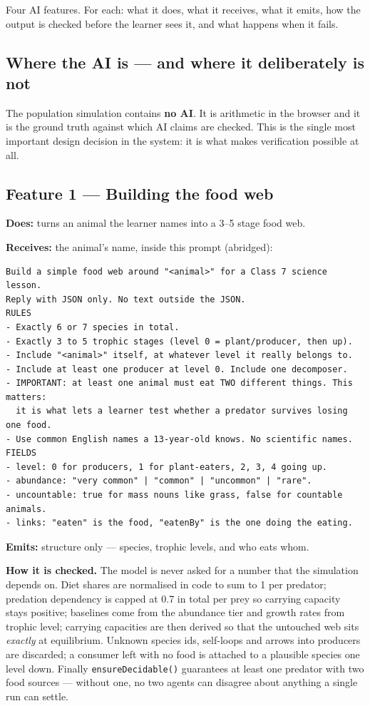 \documentclass[11pt,a4paper]{article}
\begin{document}
Four AI features. For each: what it does, what it receives, what it emits, how the output is
checked before the learner sees it, and what happens when it fails.

\subsection*{Where the AI is --- and where it deliberately is not}

The population simulation contains \textbf{no AI}. It is arithmetic in the browser and it is the
ground truth against which AI claims are checked. This is the single most important design
decision in the system: it is what makes verification possible at all.

\subsection*{Feature 1 --- Building the food web}

\textbf{Does:} turns an animal the learner names into a 3--5 stage food web.

\textbf{Receives:} the animal's name, inside this prompt (abridged):

\begin{lstlisting}
Build a simple food web around "<animal>" for a Class 7 science lesson.
Reply with JSON only. No text outside the JSON.
RULES
- Exactly 6 or 7 species in total.
- Exactly 3 to 5 trophic stages (level 0 = plant/producer, then up).
- Include "<animal>" itself, at whatever level it really belongs to.
- Include at least one producer at level 0. Include one decomposer.
- IMPORTANT: at least one animal must eat TWO different things. This matters:
  it is what lets a learner test whether a predator survives losing one food.
- Use common English names a 13-year-old knows. No scientific names.
FIELDS
- level: 0 for producers, 1 for plant-eaters, 2, 3, 4 going up.
- abundance: "very common" | "common" | "uncommon" | "rare".
- uncountable: true for mass nouns like grass, false for countable animals.
- links: "eaten" is the food, "eatenBy" is the one doing the eating.
\end{lstlisting}

\textbf{Emits:} structure only --- species, trophic levels, and who eats whom.

\textbf{How it is checked.} The model is never asked for a number that the simulation depends on.
Diet shares are normalised in code to sum to 1 per predator; predation dependency is capped at
0.7 in total per prey so carrying capacity stays positive; baselines come from the abundance
tier and growth rates from trophic level; carrying capacities are then derived so that the
untouched web sits \emph{exactly} at equilibrium. Unknown species ids, self-loops and arrows into
producers are discarded; a consumer left with no food is attached to a plausible species one
level down. Finally \texttt{ensureDecidable()} guarantees at least one predator with two food
sources --- without one, no two agents can disagree about anything a single run can settle.
\end{document}
